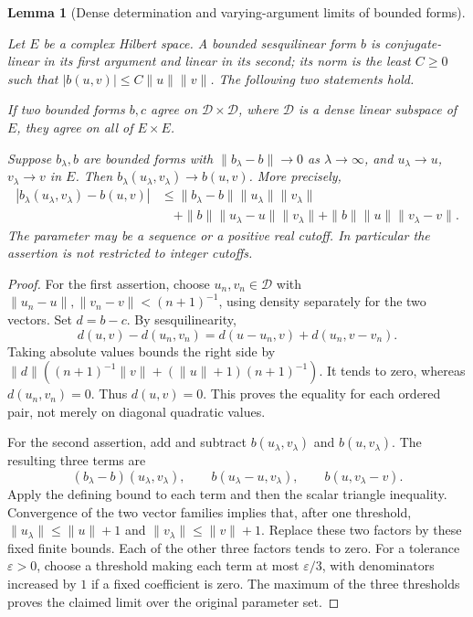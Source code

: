 \documentclass[11pt,a4paper]{article}
\newtheorem{lemma}[theorem]{Lemma}
\theoremstyle{definition}
\theoremstyle{remark}
\newcommand{\proofid}[1]{\par\smallskip{\normalfont\scriptsize\color{inkblue}Stable ID: \nolinkurl{#1}}\par\smallskip}
\begin{document}
\begin{lemma}[Dense determination and varying-argument limits of bounded forms]
\label{basic:mixed-form-limits}
\proofid{basic:mixed-form-limits}
\par{}\par\smallskip

Let $E$ be a complex Hilbert space. A bounded sesquilinear form
$b$ is conjugate-linear in its first argument and linear in its second;
its norm is the least $C\geq0$ such that
$|b(u,v)|\leq C\|u\|\|v\|$. The following two statements hold.

If two bounded forms $b,c$ agree on $\mathcal D\times\mathcal D$,
where $\mathcal D$ is a dense linear subspace of $E$, they agree
on all of $E\times E$.

Suppose $b_\lambda,b$ are bounded forms with
$\|b_\lambda-b\|\to0$ as $\lambda\to\infty$, and
$u_\lambda\to u$, $v_\lambda\to v$ in $E$. Then
$b_\lambda(u_\lambda,v_\lambda)\to b(u,v)$. More precisely,
\begin{align*}
 |b_\lambda(u_\lambda,v_\lambda)-b(u,v)|
 &\leq\|b_\lambda-b\|\|u_\lambda\|\|v_\lambda\|\\
 &\quad+\|b\|\|u_\lambda-u\|\|v_\lambda\|
       +\|b\|\|u\|\|v_\lambda-v\|.
\end{align*}
The parameter may be a sequence or a positive real cutoff. In
particular the assertion is not restricted to integer cutoffs.
\end{lemma}
\begin{proof}
For the first assertion, choose $u_n,v_n\in\mathcal D$ with
$\|u_n-u\|,\|v_n-v\|<(n+1)^{-1}$, using density separately
for the two vectors. Set $d=b-c$. By sesquilinearity,
\[
 d(u,v)-d(u_n,v_n)=d(u-u_n,v)+d(u_n,v-v_n).
\]
Taking absolute values bounds the right side by
$\|d\|((n+1)^{-1}\|v\|+(\|u\|+1)(n+1)^{-1})$.
It tends to zero, whereas $d(u_n,v_n)=0$. Thus $d(u,v)=0$.
This proves the equality for each ordered pair, not merely on
diagonal quadratic values.

For the second assertion, add and subtract
$b(u_\lambda,v_\lambda)$ and $b(u,v_\lambda)$. The resulting
three terms are
\[
 (b_\lambda-b)(u_\lambda,v_\lambda),\qquad
 b(u_\lambda-u,v_\lambda),\qquad b(u,v_\lambda-v).
\]
Apply the defining bound to each term and then the scalar triangle
inequality. Convergence of the two vector families implies that,
after one threshold, $\|u_\lambda\|\leq\|u\|+1$ and
$\|v_\lambda\|\leq\|v\|+1$. Replace these two factors by
these fixed finite bounds. Each of the other three factors tends
to zero. For a tolerance $\varepsilon>0$, choose a threshold
making each term at most $\varepsilon/3$, with denominators
increased by $1$ if a fixed coefficient is zero. The maximum of
the three thresholds proves the claimed limit over the original
parameter set.
\end{proof}
\end{document}

